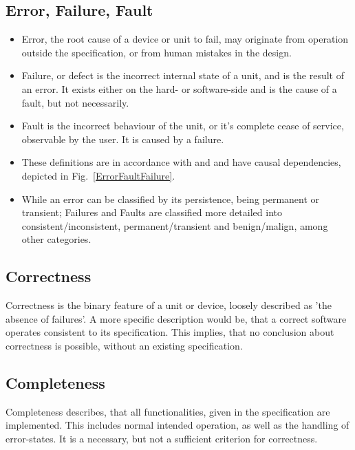 \documentclass[master,english,smartquotes,apa]{hgbthesis}
\begin{document}
	\subsection{Error, Failure, Fault}
	\begin{minipage}{\linewidth}
	\begin{itemize}
		\item {Error}, the root cause of a device or unit to fail, may originate from operation outside the specification, or from human mistakes in the design.
		\item {Failure}, or defect is the incorrect internal state of a unit, and is the result of an error. It exists either on the hard- or software-side and is the cause of a fault, but not necessarily.
		\item {Fault} is the incorrect behaviour of the unit, or it's complete cease of service, observable by the user. It is caused by a failure.
		\item These definitions are in accordance with \cite{Liggesmeyer2002} and \cite{Kopetz1997} and have causal dependencies, depicted in Fig.~\ref{ErrorFaultFailure}.
		\item While an error can be classified by its persistence, being permanent or transient; Failures and Faults are classified more detailed into consistent/inconsistent, permanent/transient and benign/malign, among other categories.
	\end{itemize}
	\end{minipage}
	
	\subsection{Correctness}
		{Correctness} is the binary feature of a unit or device, loosely described as 'the absence of failures'. A more specific description would be, that a correct software operates consistent to its specification. This implies, that no conclusion about correctness is possible, without an existing specification.
	\subsection{Completeness}
		{Completeness} describes, that all functionalities, given in the specification are implemented. This includes normal intended operation, as well as the handling of error-states. It is a necessary, but not a sufficient criterion for correctness.
\end{document}
